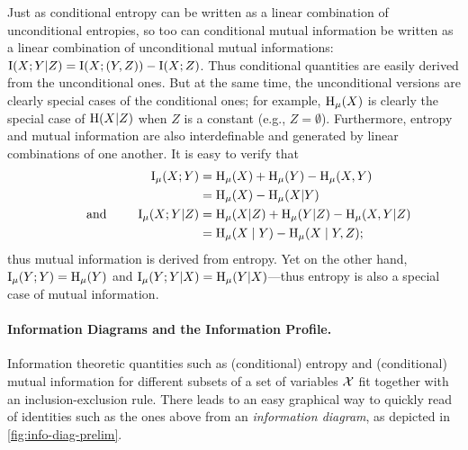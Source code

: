 Just as conditional entropy can be written as a linear combination of unconditional entropies, so too can conditional mutual information be written as a linear combination of unconditional mutual informations: $\operatorname{\mathrm{I}}(X;Y|Z) = \operatorname{\mathrm{I}}(X;(Y,Z)) - \operatorname{\mathrm{I}}(X;Z)$.  
Thus conditional quantities are easily derived from the unconditional ones. But at the same time, the unconditional versions are clearly special cases of the conditional ones; for example, $\operatorname{\mathrm{H}}_\mu(X)$ is clearly the special case of $\operatorname{\mathrm{H}}(X|Z)$ when $Z$ is a constant (e.g., $Z = \emptyset$). 
Furthermore, entropy and mutual information are also interdefinable and generated by linear combinations of one another. 
It is easy to verify that 
\begin{align*}
    \operatorname{\mathrm{I}}_\mu(X;Y) 
    &= \operatorname{\mathrm{H}}_\mu(X) + \operatorname{\mathrm{H}}_\mu(Y) - \operatorname{\mathrm{H}}_\mu(X,Y)
    \\&=  \operatorname{\mathrm{H}}_\mu(X)  - \operatorname{\mathrm{H}}_\mu(X|Y)
\\ \qquad\text{ and }\qquad
    \operatorname{\mathrm{I}}_\mu(X;Y|Z)
    &= \operatorname{\mathrm{H}}_\mu(X|Z) + \operatorname{\mathrm{H}}_\mu(Y|Z) - \operatorname{\mathrm{H}}_\mu(X,Y|Z)
    \\&= \operatorname{\mathrm{H}}_\mu(X \mid Y) - \operatorname{\mathrm{H}}_\mu(X \mid Y, Z);
\end{align*}
thus mutual information is derived from entropy. 
Yet on the other hand, $\operatorname{\mathrm{I}}_\mu(Y;Y) = \operatorname{\mathrm{H}}_\mu(Y)$ and $\operatorname{\mathrm{I}}_\mu(Y;Y|X) = \operatorname{\mathrm{H}}_\mu(Y|X)$---thus entropy is also a special case of mutual information. 

\paragraph{Information Diagrams and the Information Profile.}
Information theoretic quantities such as (conditional) entropy and (conditional) mutual information for different subsets of a set of variables $\mathcal X$ fit together with an inclusion-exclusion rule. 
There leads to an easy graphical way to quickly read of identities such as the ones above from an \emph{information diagram}, 
as depicted in \cref{fig:info-diag-prelim}.

